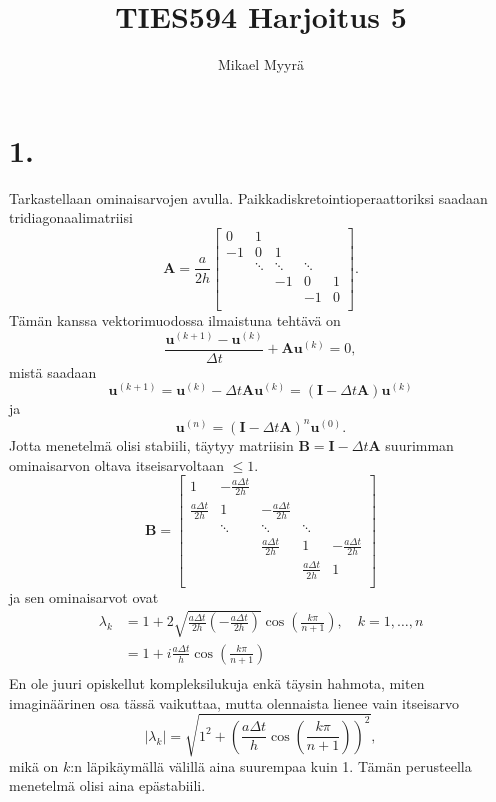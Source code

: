 \documentclass{article}
\title{TIES594 Harjoitus 5}
\author{Mikael Myyrä}
\date{}
\begin{document}
\section*{1.}

Tarkastellaan ominaisarvojen avulla.
Paikkadiskretointioperaattoriksi saadaan tridiagonaalimatriisi
\[
  \mathbf{A} = \frac{a}{2h}
  \begin{bmatrix}
    0 & 1 \\
    -1 & 0 & 1 \\
        & \ddots & \ddots & \ddots \\
        & & -1 & 0 & 1 \\
        & & & -1 & 0 \\
  \end{bmatrix}.
\]
Tämän kanssa vektorimuodossa ilmaistuna tehtävä on
\[
  \frac{\mathbf{u}^{(k+1)} - \mathbf{u}^{(k)}}{\Delta t} + \mathbf{A}\mathbf{u}^{(k)} = 0,
\]
mistä saadaan
\[
  \mathbf{u}^{(k+1)} = \mathbf{u}^{(k)} - \Delta t \mathbf{A}\mathbf{u}^{(k)}
  = (\mathbf{I} - \Delta t \mathbf{A})\mathbf{u}^{(k)}
\]
ja
\[
  \mathbf{u}^{(n)} = (\mathbf{I} - \Delta t \mathbf{A})^n \mathbf{u}^{(0)}.
\]
Jotta menetelmä olisi stabiili, täytyy matriisin
$\mathbf{B} = \mathbf{I} - \Delta t \mathbf{A}$ suurimman ominaisarvon oltava
itseisarvoltaan $\leq 1$.
\[
  \mathbf{B} =
  \begin{bmatrix}
    1 & -\frac{a\Delta t}{2h} \\
    \frac{a\Delta t}{2h} & 1 & -\frac{a\Delta t}{2h} \\
                         & \ddots & \ddots & \ddots \\
                         & & \frac{a\Delta t}{2h} & 1 & -\frac{a\Delta t}{2h} \\
                         & & & \frac{a\Delta t}{2h} & 1 \\
  \end{bmatrix}
\]
ja sen ominaisarvot ovat
\begin{align*}
  \lambda_k &= 1 + 2\sqrt{\frac{a\Delta t}{2h}(-\frac{a\Delta t}{2h})}
        \cos(\frac{k\pi}{n + 1}), \quad k = 1, \dots, n \\
            &= 1 + i\frac{a\Delta t}{h}\cos(\frac{k\pi}{n + 1}) \\
\end{align*}
En ole juuri opiskellut kompleksilukuja enkä täysin hahmota, miten
imaginäärinen osa tässä vaikuttaa, mutta olennaista lienee vain itseisarvo
\[
  |\lambda_k| = \sqrt{1^2 + (\frac{a\Delta t}{h}\cos(\frac{k\pi}{n + 1}))^2},
\]
mikä on $k$:n läpikäymällä välillä aina suurempaa kuin 1.
Tämän perusteella menetelmä olisi aina epästabiili.
\end{document}
